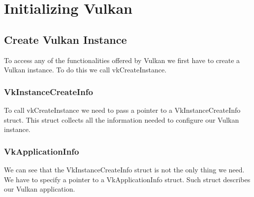 \chapter{Initializing Vulkan}

\section{Create Vulkan Instance}

To access any of the functionalities offered by Vulkan we first have to create a Vulkan
instance.
To do this we call vkCreateInstance.

\begin{minipage}{\linewidth}{\noindent}
    
\end{minipage}

\subsection{VkInstanceCreateInfo}

To call vkCreateInstance we need to pass a pointer to a VkInstanceCreateInfo struct.
This struct collects all the information needed to configure our Vulkan instance.

\begin{minipage}{\linewidth}{\noindent}

\end{minipage}

\subsection{VkApplicationInfo}

We can see that the VkInstanceCreateInfo struct is not the only thing we need.
We have to specify a pointer to a VkApplicationInfo struct. Such struct describes
our Vulkan application.

\begin{minipage}{\linewidth}{\noindent}
    
\end{minipage}

